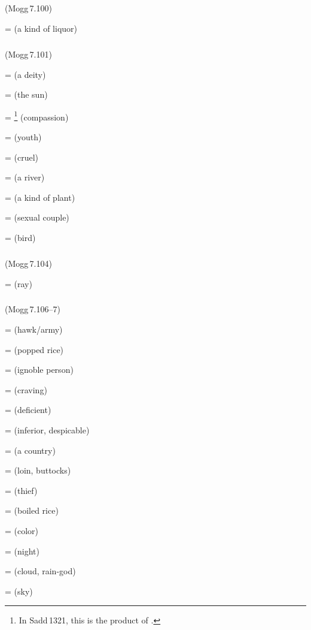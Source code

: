 \subparagraph*{} (Mogg\,7.100)\label{pacckx:dhuka}

 =  (a kind of liquor)\par

\subparagraph*{} (Mogg\,7.101)\label{pacckx:kuna}

 =  (a deity)\par
{} =  (the sun)\par
{} = \footnote{In Sadd\,1321, this is the product of .} (compassion)\par
{} =  (youth)\par
{} =  (cruel)\par
{} =  (a river)\par
{} =  (a kind of plant)\par
{} =  (sexual couple)\par
{} =  (bird)\par

\subparagraph*{} (Mogg\,7.104)\label{pacckx:kana}

 =  (ray)\par

\subparagraph*{} (Mogg\,7.106--7)\label{pacckx:na}

 =  (hawk/army)\par
{} =  (popped rice)\par
{} =  (ignoble person)\par
{} =  (craving)\par
{} =  (deficient)\par
{} =  (inferior, despicable)\par
{} =  (a country)\par
{} =  (loin, buttocks)\par
{} =  (thief)\par
{} =  (boiled rice)\par
{} =  (color)\par
{} =  (night)\par
{} =  (cloud, rain-god)\par
{} =  (sky)\par

